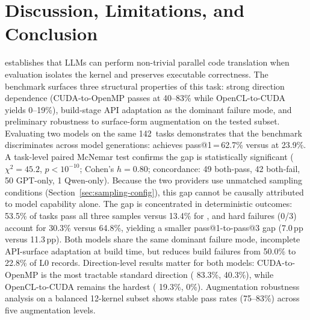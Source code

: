 \section{Discussion, Limitations, and Conclusion}
\label{sec:discussion}

\parbench{} establishes that LLMs can perform non-trivial parallel code translation when evaluation isolates the kernel and preserves executable correctness. The benchmark surfaces three structural properties of this task: strong direction dependence (CUDA-to-OpenMP passes at 40--83\% while OpenCL-to-CUDA yields 0--19\%), build-stage API adaptation as the dominant failure mode, and preliminary robustness to surface-form augmentation on the tested subset. Evaluating two models on the same 142~tasks demonstrates that the benchmark discriminates across model generations: \gptnew{} achieves pass@1\,=\,62.7\% versus \qwenshort{} at 23.9\%. A task-level paired McNemar test confirms the gap is statistically significant ($\chi^2 = 45.2$, $p < 10^{-10}$; Cohen's $h = 0.80$; concordance: 49 both-pass, 42 both-fail, 50 GPT-only, 1 Qwen-only). Because the two providers use unmatched sampling conditions (Section~\ref{sec:sampling-config}), this gap cannot be causally attributed to model capability alone. %
The gap is concentrated in deterministic outcomes: 53.5\% of \gptnew{} tasks pass all three samples versus 13.4\% for \qwenshort{}, and hard failures (0/3) account for 30.3\% versus 64.8\%, yielding a smaller pass@1-to-pass@3 gap (7.0\,pp versus 11.3\,pp). Both models share the same dominant failure mode, incomplete API-surface adaptation at build time, but \gptnew{} reduces build failures from 50.0\% to 22.8\% of L0 records. Direction-level results matter for both models: CUDA-to-OpenMP is the most tractable standard direction (\gptnew{} 83.3\%, \qwenshort{} 40.3\%), while OpenCL-to-CUDA remains the hardest (\gptnew{} 19.3\%, \qwenshort{} 0\%). Augmentation robustness analysis on a balanced 12-kernel subset shows stable pass rates (75--83\%) across five augmentation levels.


